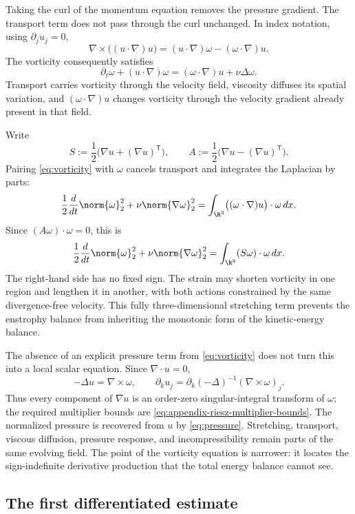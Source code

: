 Taking the curl of the momentum equation removes the pressure gradient.  The
transport term does not pass through the curl unchanged.  In index notation,
using \(\partial_j u_j=0\),
\[
 \nabla\times\bigl((u\cdot\nabla)u\bigr)
 =(u\cdot\nabla)\omega-(\omega\cdot\nabla)u.
\]
The vorticity consequently satisfies
\begin{equation}
 \partial_t\omega+(u\cdot\nabla)\omega
 =(\omega\cdot\nabla)u+\nu\Delta\omega.
 \label{eq:vorticity}
\end{equation}
Transport carries vorticity through the velocity field, viscosity diffuses
its spatial variation, and \((\omega\cdot\nabla)u\) changes vorticity through
the velocity gradient already present in that field.

Write
\[
 S:=\frac12\bigl(\nabla u+(\nabla u)^{\mathsf T}\bigr),
 \qquad
 A:=\frac12\bigl(\nabla u-(\nabla u)^{\mathsf T}\bigr).
\]
Pairing \eqref{eq:vorticity} with \(\omega\) cancels transport and integrates
the Laplacian by parts:
\[
 \frac12\frac d{dt}\norm{\omega}_2^2
 +\nu\norm{\nabla\omega}_2^2
 =\int_{\R^3}\bigl((\omega\cdot\nabla)u\bigr)\cdot\omega\,dx.
\]
Since \((A\omega)\cdot\omega=0\), this is
\begin{equation*}
 \frac12\frac d{dt}\norm{\omega}_2^2
 +\nu\norm{\nabla\omega}_2^2
 =\int_{\R^3}(S\omega)\cdot\omega\,dx.
\end{equation*}
The right-hand side has no fixed sign.  The strain may shorten vorticity in
one region and lengthen it in another, with both actions constrained by the
same divergence-free velocity.  This fully three-dimensional stretching term
prevents the enstrophy balance from inheriting the monotonic form of the
kinetic-energy balance.

The absence of an explicit pressure term from \eqref{eq:vorticity} does not
turn this into a local scalar equation.  Since \(\nabla\cdot u=0\),
\[
 -\Delta u=\nabla\times\omega,
 \qquad
 \partial_k u_j
 =\partial_k(-\Delta)^{-1}(\nabla\times\omega)_j.
\]
Thus every component of \(\nabla u\) is an order-zero singular-integral
transform of \(\omega\); the required multiplier bounds are
\eqref{eq:appendix-riesz-multiplier-bounds}.  The normalized pressure is recovered
from \(u\) by \eqref{eq:pressure}.  Stretching, transport,
viscous diffusion, pressure response, and incompressibility remain parts of
the same evolving field.  The point of the vorticity equation is narrower:
it locates the sign-indefinite derivative production that the total energy
balance cannot see.

\subsection{The first differentiated estimate}

